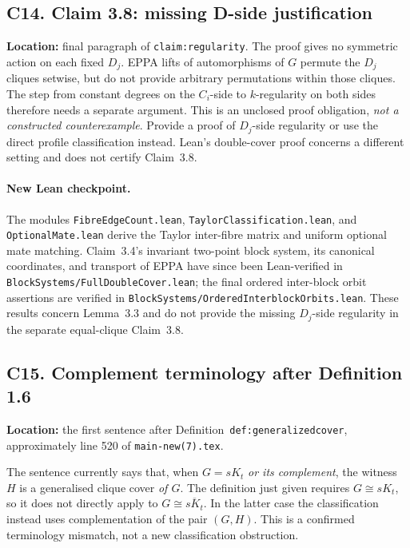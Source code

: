 \documentclass[11pt,a4paper]{article}
\begin{document}
\subsection*{C14. Claim 3.8: missing D-side justification}
\textbf{Location:} final paragraph of \texttt{claim:regularity}.
The proof gives no symmetric action on each fixed \(D_j\).
EPPA lifts of automorphisms of \(G\) permute the \(D_j\)
cliques setwise, but do not provide arbitrary permutations
within those cliques. The step from constant degrees on the
\(C_i\)-side to \(k\)-regularity on both sides therefore
needs a separate argument. This is an unclosed proof
obligation, \emph{not a constructed counterexample}.
Provide a proof of \(D_j\)-side regularity or use the
direct profile classification instead. Lean's
double-cover proof concerns a different setting and
does not certify Claim~3.8.

\paragraph{New Lean checkpoint.}
The modules \texttt{FibreEdgeCount.lean},
\texttt{TaylorClassification.lean}, and
\texttt{OptionalMate.lean} derive the Taylor
inter-fibre matrix and uniform optional mate matching.
Claim~3.4's invariant two-point block system, its
canonical coordinates, and transport of EPPA have
since been Lean-verified in
\texttt{BlockSystems/FullDoubleCover.lean};
the final ordered inter-block orbit assertions
are verified in
\texttt{BlockSystems/OrderedInterblockOrbits.lean}.
These results concern Lemma~3.3 and do not
provide the missing \(D_j\)-side regularity
in the separate equal-clique Claim~3.8.


\subsection*{C15. Complement terminology after Definition 1.6}
\textbf{Location:} the first sentence after
Definition~\texttt{def:generalizedcover}, approximately
line 520 of \texttt{main-new(7).tex}.

The sentence currently says that, when
\(G=sK_t\) \emph{or its complement}, the witness
\(H\) is a generalised clique cover \emph{of \(G\)}.
The definition just given requires \(G\cong sK_t\),
so it does not directly apply to \(G\cong\overline{sK_t}\).
In the latter case the classification instead uses
complementation of the pair \((G,H)\). This is a
confirmed terminology mismatch, not a new classification
obstruction.
\end{document}

